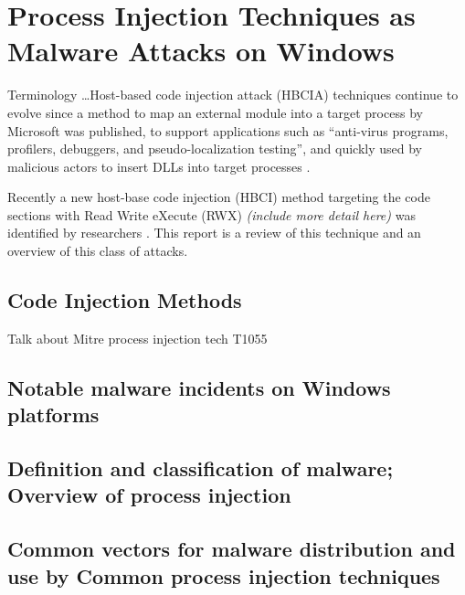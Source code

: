 




\section{Process Injection Techniques as Malware Attacks on Windows}

Terminology \ldots Host-based code injection attack (HBCIA) techniques \autocite{Barabosch:2014} continue to evolve since a method to map an external module into a target process by Microsoft \autocite{Ghizzoni:2004} was published, to support applications such as ``anti-virus programs, profilers, debuggers, and pseudo-localization testing'', and quickly used by malicious actors to insert DLLs into target processes \autocite{Jang:2007}.

Recently a new host-base code injection (HBCI) method targeting the code sections with Read Write eXecute (RWX)  \textit{(include more detail here)} was identified by researchers \autocite{Peixoto:2023}.  This report is a review of this technique and an overview of this class of attacks.

\subsection{Code Injection Methods}

Talk about Mitre process injection tech T1055 \autocite{Mitre:2017}

\subsection{Notable malware incidents on Windows platforms}

\subsection{Definition and classification of malware; Overview of process injection}

\subsection{Common vectors for malware distribution and use by Common process injection techniques}

